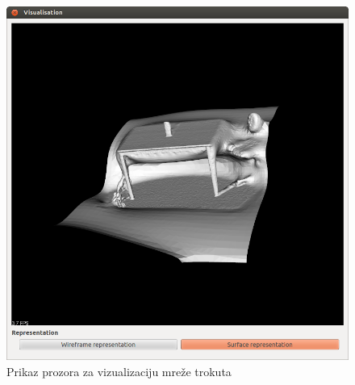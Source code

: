\begin{figure}[h]
\centering
\includegraphics[scale=0.4]{figures/gui-2.png}
\caption{Prikaz prozora za vizualizaciju mreže trokuta}
\label{fig:gui-2.png}
\end{figure}


